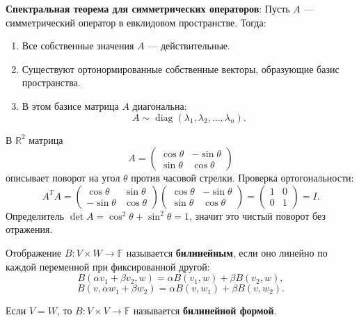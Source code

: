\documentclass[12pt]{article}
\begin{document}
\begin{theorembox}
\textbf{Спектральная теорема для симметрических операторов}: Пусть $A$ — симметрический оператор в евклидовом пространстве. Тогда:
\begin{enumerate}
    \item Все собственные значения $A$ — действительные.
    \item Существуют ортонормированные собственные векторы, образующие базис пространства.
    \item В этом базисе матрица $A$ диагональна:
    $$
    A \sim \operatorname{diag}(\lambda_1, \lambda_2, \dots, \lambda_n).
    $$
\end{enumerate}
\end{theorembox}

\begin{examplebox}
В $\mathbb{R}^2$ матрица
$$
A =
\begin{pmatrix}
\cos\theta & -\sin\theta \\
\sin\theta & \cos\theta
\end{pmatrix}
$$
описывает поворот на угол $\theta$ против часовой стрелки.  
Проверка ортогональности:
$$
A^T A =
\begin{pmatrix}
\cos\theta & \sin\theta \\
-\sin\theta & \cos\theta
\end{pmatrix}
\begin{pmatrix}
\cos\theta & -\sin\theta \\
\sin\theta & \cos\theta
\end{pmatrix}
=
\begin{pmatrix}
1 & 0 \\
0 & 1
\end{pmatrix} = I.
$$
Определитель $\det A = \cos^2\theta + \sin^2\theta = 1$, значит это чистый поворот без отражения.
\end{examplebox}

\begin{definitionbox}
Отображение $ B : V \times W \to \mathbb{F} $ называется \textbf{билинейным}, если оно линейно по каждой переменной при фиксированной другой:
$$
B(\alpha v_1 + \beta v_2, w) = \alpha B(v_1, w) + \beta B(v_2, w),
$$
$$
B(v, \alpha w_1 + \beta w_2) = \alpha B(v, w_1) + \beta B(v, w_2).
$$
\end{definitionbox}

\begin{definitionbox}
Если $ V = W $, то $ B : V \times V \to \mathbb{F} $ называется \textbf{билинейной формой}.
\end{definitionbox}
\end{document}
